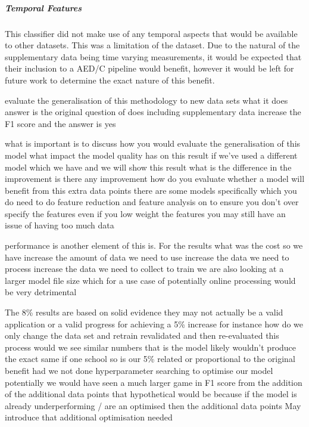 \documentclass{UoNMCHA}
\numberwithin{equation}{section}
\begin{document}
\subparagraph{Temporal Features}
This classifier did not make use of any temporal aspects that would be available to other datasets. This was a limitation of the dataset. Due to the natural of the supplementary data being time varying measurements, it would be expected that their inclusion to a AED/C pipeline would benefit, however it would be left for future work to determine the exact nature of this benefit.

evaluate the generalisation of this methodology to new data sets
what it does answer is the original question of does including supplementary data increase the F1 score and the answer is yes

what is important is to discuss how you would evaluate the generalisation of this model 
what impact the model quality has on this result if we've used a different model which we have and we will show this result what is the difference in the improvement 
is there any improvement how do you evaluate whether a model will benefit from this extra data points there are some models specifically which you do need to do feature reduction and feature analysis on to ensure you don't over specify the features even if you low weight the features you may still have an issue of having too much data

performance is another element of this is. For the results what was the cost so we have increase the amount of data we need to use increase the data we need to process increase the data we need to collect to train we are also looking at a larger model file size which for a use case of potentially online processing would be very detrimental

The 8\% results are based on solid evidence they may not actually be a valid application or a valid progress for achieving a 5\% increase for instance how do we only change the data set and retrain revalidated and then re-evaluated this process would we see similar numbers that is the model likely wouldn't produce the exact same if one school so is our 5\% related or proportional to the original benefit had we not done hyperparameter searching to optimise our model potentially we would have seen a much larger game in F1 score from the addition of the additional data points that hypothetical would be because if the model is already underperforming / are an optimised then the additional data points May introduce that additional optimisation needed
\end{document}

